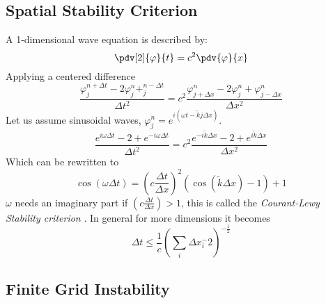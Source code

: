     \subsection{Spatial Stability Criterion}
        A 1-dimensional wave equation is described by:
        \begin{equation}
                \pdv[2]{\varphi}{t} = c^2 \pdv{\varphi}{x}
        \end{equation}
        Applying a centered difference
        \begin{equation}
            \frac{\varphi^{n + \Delta t}_{j} - 2 \varphi^{n}_{j} + ^{n - \Delta t}_{j}}{\Delta t^2}
            =
            c^2\frac{\varphi^n_{j+\Delta x} - 2\varphi^n_{j} + \varphi^n_{j-\Delta x}}{\Delta x^2}
        \end{equation}
        Let us assume sinusoidal waves, \(\varphi^n_j = e^{i(\omega t  - \tilde{k}j\Delta x)}\).
        \begin{equation}
            \frac{e^{i\omega \Delta t} - 2 +e^{-i\omega \Delta t} }{\Delta t^2}
            = c^2 \frac{e^{-i\tilde k \Delta x} - 2 + e^{i\tilde k \Delta x}}{\Delta x ^2}
        \end{equation}
        Which can be rewritten to
        \begin{equation}
            \cos(\omega \Delta t) = \left(c\frac{\Delta t}{\Delta x}\right)^2\left(\cos(\tilde k \Delta x) - 1 \right) + 1
        \end{equation}
        \(\omega\) needs an imaginary part if \( \left(c\frac{\Delta t}{\Delta x}\right)>1\), this is called the \textit{Courant-Lewy Stability criterion}
        \citep{courant_uber_1869}. In general for more dimensions it becomes
        \begin{equation}
            \Delta t \leq \frac{1}{c} \left(\sum_i\Delta x_i^-2\right)^{-\frac{1}{2}}
        \end{equation}

    \subsection{Finite Grid Instability}

